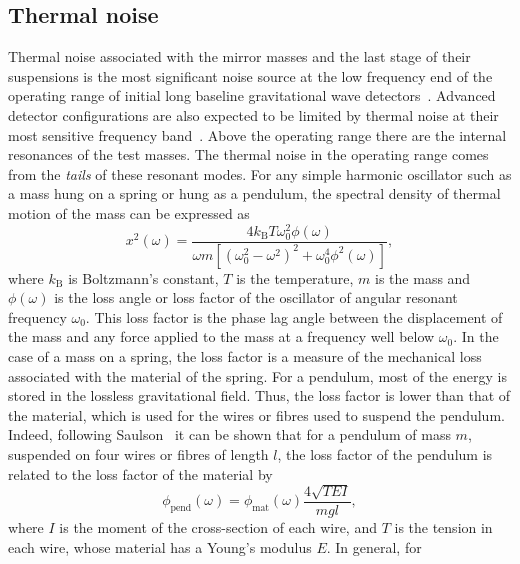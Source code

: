\documentclass{article}
\begin{document}
\subsection{Thermal noise}
\label{subsection:thermal}

Thermal noise associated with the mirror masses and the last stage of their
suspensions is the most significant noise source at the low frequency end of the
operating range of initial long baseline gravitational wave
detectors~\cite{Saulson2}. Advanced detector configurations are also expected to
be limited by thermal noise at their most sensitive frequency
band~\cite{Levin, Nakagawa:2002, Harry:2002, Crooks:2002}. Above the operating
range there are the internal resonances of the test masses. The thermal noise in
the operating range comes from the \emph{tails} of these resonant modes. For any
simple harmonic oscillator such as a mass hung on a spring or hung as a pendulum,
the spectral density of thermal motion of the mass can be expressed
as~\cite{Saulson2}
%
\begin{equation}
  x^{2}(\omega) = \frac{4 k_{\mathrm{B}} T \omega_{0}^{2}
  \phi(\omega)}{\omega m [{(\omega_{0}^{2} - \omega^{2})^2 +
  \omega_{0}^{4} \phi^{2}(\omega)}]},
  \label{equation:thnoise}
\end{equation}
%
where $k_{\mathrm{B}}$ is Boltzmann's constant, $T$ is the temperature, $m$ is the
mass and  $\phi(\omega)$ is the loss angle or loss factor of the
oscillator of angular resonant frequency $\omega_0$. This loss factor is the
phase lag angle between the displacement of the mass and any force applied to
the mass at a frequency well below $\omega_0$. In the case of a mass on a spring,
the loss factor is a measure of the mechanical loss associated with the material
of the spring. For a pendulum, most of the energy is stored in the lossless
gravitational field. Thus, the loss factor is lower than that of the material,
which is used for the wires or fibres used to suspend the pendulum. Indeed,
following Saulson~\cite{Saulson2} it can be shown that for a pendulum of mass
$m$, suspended on four wires or fibres of length $l$, the loss factor of the
pendulum is related to the loss factor of the material by
%
\begin{equation}
  \phi_{\mathrm{pend}}(\omega) = \phi_{\mathrm{mat}}(\omega)\frac{4 \sqrt{TEI}}{mgl},
  \label{equation:pend}
\end{equation}
%
where $I$ is the moment of the cross-section of  each wire, and $T$ is the
tension in each wire, whose material has a Young's modulus $E$. In general, for
\end{document}
